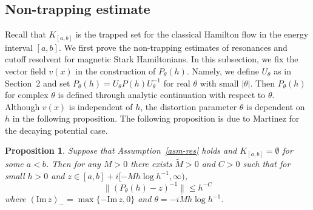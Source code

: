 \documentclass{article}
\theoremstyle{plain}
\newtheorem{prop}{Proposition}[section]
\theoremstyle{definition}
\theoremstyle{remark}
\newcommand{\IM}{\mathrm{Im}\,}
\begin{document}
\subsection{Non-trapping estimate}
Recall that $K_{[a, b]}$ is the trapped set for the classical Hamilton flow in the energy interval $[a, b]$. 
We first prove the non-trapping estimates of resonances and cutoff resolvent for magnetic Stark Hamiltonians. 
In this subsection, we fix the vector field $v(x)$ in the construction of $P_{\theta}(h)$. 
Namely, we define $U_{\theta}$ as in Section~2 and set $P_{\theta}(h)=U_{\theta}P(h)U_{\theta}^{-1}$ for real $\theta$ with 
small $|\theta|$. Then $P_{\theta}(h)$ for complex $\theta$ is defined through analytic continuation with respect to $\theta$. 
Although $v(x)$ is independent of $h$, the distortion parameter $\theta$ 
is dependent on $h$ in the following proposition. 
The following proposition is due to Martinez \cite{M} for the decaying potential case.
\begin{prop}\label{prop-nontrapping}
Suppose that Assumption~\ref{asm-res} holds and $K_{[a,b]}=\emptyset$ for some $a<b$. 
Then for any $M>0$ there exists $\widetilde{M}>0$ and $C>0$ 
such that for small $h>0$ and $z \in [a ,b]+i[-Mh\log h^{-1}, \infty)$, 
\[
\|(P_{\theta}(h)-z)^{-1}\|\le h^{-C} 
\]
where $(\IM z)_-=\max\{-\IM z, 0\}$ and $\theta=-i\widetilde{M}h\log h^{-1}$. 
\end{prop}
\end{document}
